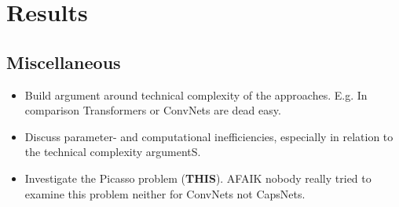 \documentclass{article}
\begin{document}

\section{Results}
\subsection{Miscellaneous}
\begin{itemize}
	\item Build argument around technical complexity of the approaches. E.g. In comparison Transformers or ConvNets are dead easy.
	\item Discuss parameter- and computational inefficiencies, especially in relation to the technical complexity argumentS.
	\item Investigate the Picasso problem (\textbf{THIS}). AFAIK nobody really tried to examine this problem neither for ConvNets not CapsNets.
\end{itemize}
\end{document}
